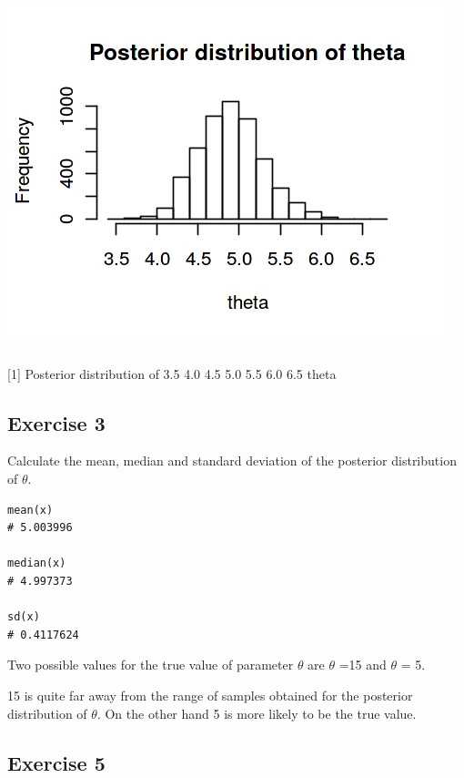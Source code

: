 \documentclass[a4paper,12pt]{article}
\begin{document}
\includegraphics[]{00-A1/images/Exercise_2_B.jpeg}



\begin{framed}\begin{verbatim}
\end{verbatim}\end{framed}
[1]
Posterior distribution of
3.5
4.0
4.5
5.0
5.5
6.0
6.5
theta
\newpage 
\subsection*{Exercise 3}

\noindent Calculate the mean, median and standard deviation of the posterior distribution
of $\theta$.

\begin{framed}
\begin{verbatim}
mean(x)
# 5.003996 

median(x)
# 4.997373

sd(x)
# 0.4117624 
\end{verbatim}
\end{framed}

Two possible values for the true value of parameter $\theta$ are $\theta$ =15 and $\theta$ = 5.


15 is quite far away from the range of samples obtained for the posterior distribution
of $\theta$.
On the other hand 5 is more likely to be the true value.


\newpage 
\subsection*{Exercise 5}
\end{document}
